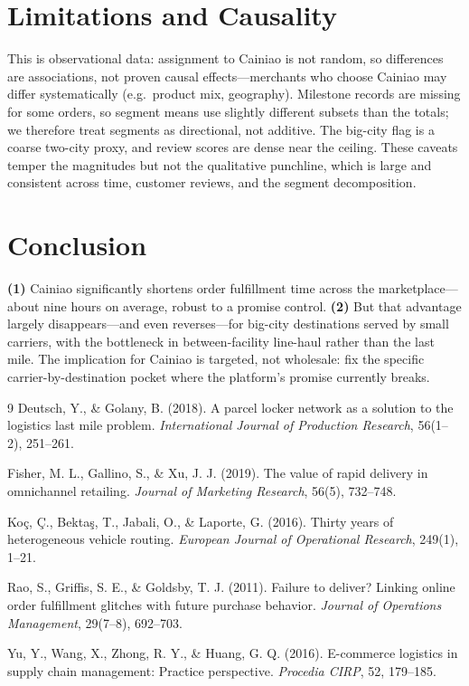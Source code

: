 \documentclass[11pt]{article}
\begin{document}
\section{Limitations and Causality}
This is observational data: assignment to Cainiao is not random, so differences are
associations, not proven causal effects---merchants who choose Cainiao may differ
systematically (e.g.\ product mix, geography). Milestone records are missing for
some orders, so segment means use slightly different subsets than the totals; we
therefore treat segments as directional, not additive. The big-city flag is a
coarse two-city proxy, and review scores are dense near the ceiling. These caveats
temper the magnitudes but not the qualitative punchline, which is large and
consistent across time, customer reviews, and the segment decomposition.

\section{Conclusion}
\textbf{(1)} Cainiao significantly shortens order fulfillment time across the
marketplace---about nine hours on average, robust to a promise control.
\textbf{(2)} But that advantage largely disappears---and even reverses---for
big-city destinations served by small carriers, with the bottleneck in
between-facility line-haul rather than the last mile. The implication for Cainiao
is targeted, not wholesale: fix the specific carrier-by-destination pocket where
the platform's promise currently breaks.

\clearpage
\begin{thebibliography}{9}
Deutsch, Y., \& Golany, B. (2018). A parcel locker network as a solution to the
logistics last mile problem. \emph{International Journal of Production Research},
56(1--2), 251--261.

Fisher, M. L., Gallino, S., \& Xu, J. J. (2019). The value of rapid delivery in
omnichannel retailing. \emph{Journal of Marketing Research}, 56(5), 732--748.

Ko\c{c}, \c{C}., Bekta\c{s}, T., Jabali, O., \& Laporte, G. (2016). Thirty years of
heterogeneous vehicle routing. \emph{European Journal of Operational Research},
249(1), 1--21.

Rao, S., Griffis, S. E., \& Goldsby, T. J. (2011). Failure to deliver? Linking
online order fulfillment glitches with future purchase behavior. \emph{Journal of
Operations Management}, 29(7--8), 692--703.

Yu, Y., Wang, X., Zhong, R. Y., \& Huang, G. Q. (2016). E-commerce logistics in
supply chain management: Practice perspective. \emph{Procedia CIRP}, 52, 179--185.
\end{thebibliography}
\end{document}
